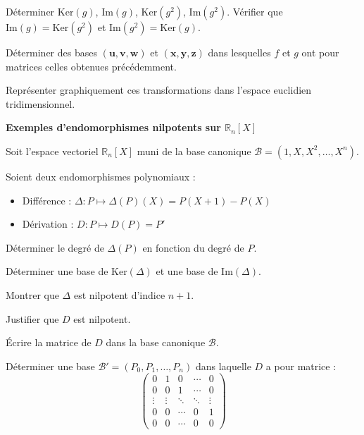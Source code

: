 \documentclass[10pt,a4paper]{article}
\begin{document}
\q Déterminer $\mathrm{Ker}(g)$, $\mathrm{Im}(g)$, $\mathrm{Ker}(g^2)$, $\mathrm{Im}(g^2)$. Vérifier
que $\mathrm{Im}(g) = \mathrm{Ker}(g^2)$ et $\mathrm{Im}(g^2) = \mathrm{Ker}(g)$.

\q Déterminer des bases $(\mathbf{u}, \mathbf{v}, \mathbf{w})$ et $(\mathbf{x}, \mathbf{y},
\mathbf{z})$ dans lesquelles $f$ et $g$ ont pour matrices celles obtenues précédemment.

\q Représenter graphiquement ces transformations dans l'espace euclidien tridimensionnel.

\bigskip
\textbf{Exemples d'endomorphismes nilpotents sur $\mathbb{R}_n[X]$}

Soit l'espace vectoriel $\mathbb{R}_n[X]$ muni de la base canonique $\mathscr{B} = (1, X,
X^2, \dots, X^n)$.

Soient deux endomorphismes polynomiaux :
\begin{itemize}
\item Différence : $\Delta : P \mapsto \Delta(P)(X) = P(X+1) - P(X)$
\item Dérivation : $D : P \mapsto D(P) = P'$
\end{itemize}

\q Déterminer le degré de $\Delta(P)$ en fonction du degré de $P$.

\q Déterminer une base de $\mathrm{Ker}(\Delta)$ et une base de $\mathrm{Im}(\Delta)$.

\q Montrer que $\Delta$ est nilpotent d'indice $n+1$.

\q Justifier que $D$ est nilpotent.

\q Écrire la matrice de $D$ dans la base canonique $\mathscr{B}$.

\q Déterminer une base $\mathscr{B}' = (P_0, P_1, \dots, P_n)$ dans laquelle $D$ a pour matrice :
\[
\begin{pmatrix}
0 & 1 & 0 & \cdots & 0\\
0 & 0 & 1 & \cdots & 0\\
\vdots & \vdots & \ddots & \ddots & \vdots\\
0 & 0 & \cdots & 0 & 1\\
0 & 0 & \cdots & 0 & 0
\end{pmatrix}
\]
\end{document}

